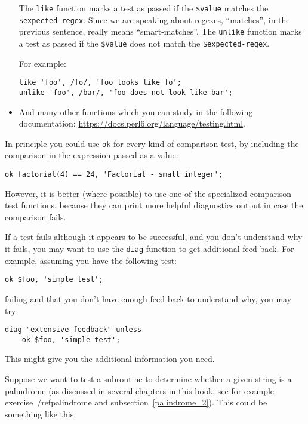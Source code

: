 \begin{itemize}
The {\tt like} function marks a test as passed if the 
\verb'$value' matches the \verb'$expected-regex'. Since 
we are speaking about regexes, ``matches'', in the 
previous sentence, really means ``smart-matches''. The 
{\tt unlike} function marks a test as passed if the 
\verb'$value' does not match the \verb'$expected-regex'.

For example:
\begin{verbatim}
like 'foo', /fo/, 'foo looks like fo';
unlike 'foo', /bar/, 'foo does not look like bar';
\end{verbatim}

\item And many other functions which you can study in the 
following documentation: \url{https://docs.perl6.org/language/testing.html}.

\end{itemize}

In principle you could use {\tt ok} for every kind of 
comparison test, by including the comparison in the 
expression passed as a value:

\begin{verbatim}
ok factorial(4) == 24, 'Factorial - small integer';
\end{verbatim}

However, it is better (where possible) to use one of the 
specialized comparison test functions, because they can 
print more helpful diagnostics output in case the comparison 
fails.

If a test fails although it appears to be successful, and 
you don't understand why it fails, you may want to use the 
\verb'diag' function to get additional feed back. For example,
assuming you have the following test:

\begin{verbatim}
ok $foo, 'simple test';
\end{verbatim} 

failing and that you don't have enough feed-back to 
understand why, you may try:

\begin{verbatim}
diag "extensive feedback" unless
    ok $foo, 'simple test';
\end{verbatim}

This might give you the additional information you need.

Suppose we want to test a subroutine to determine whether a 
given string is a palindrome (as discussed in several chapters 
in this book, see for example exercise~/ref{palindrome} and 
subsection~\ref{palindrome_2}). This could be something 
like this:

